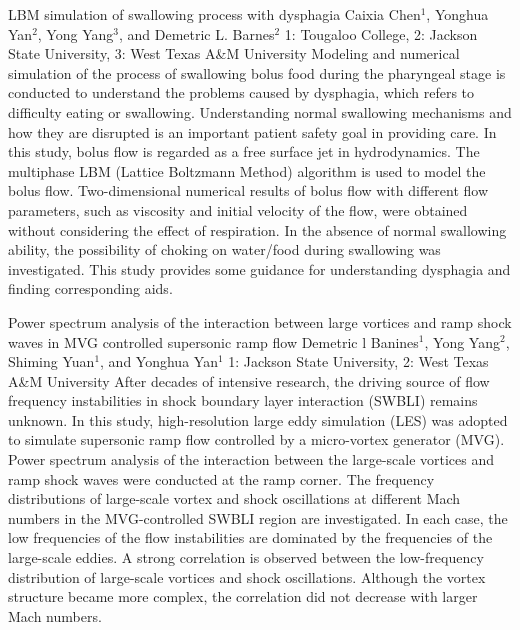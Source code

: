 \vspace{1.5ex}
\abs
{LBM simulation of swallowing process with dysphagia}
{Caixia Chen$^{1}$, Yonghua Yan$^{2}$, Yong Yang$^{3}$, and Demetric L. Barnes$^{2}$}
{1: Tougaloo College, 2: Jackson State University, 3: West Texas A\&M University}
{Modeling and numerical simulation of the process of swallowing bolus food during the pharyngeal stage is conducted to understand the problems caused by dysphagia, which refers to difficulty eating or swallowing. Understanding normal swallowing mechanisms and how they are disrupted is an important patient safety goal in providing care. In this study, bolus flow is regarded as a free surface jet in hydrodynamics. The multiphase LBM (Lattice Boltzmann Method) algorithm is used to model the bolus flow. Two-dimensional numerical results of bolus flow with different flow parameters, such as viscosity and initial velocity of the flow, were obtained without considering the effect of respiration. In the absence of normal swallowing ability, the possibility of choking on water/food during swallowing was investigated. This study provides some guidance for understanding dysphagia and finding corresponding aids.}


\vspace{1.5ex}
\abs
{Power spectrum analysis of the interaction between large vortices and ramp shock waves in MVG controlled supersonic ramp flow}
{Demetric l Banines$^{1}$, Yong Yang$^{2}$, Shiming Yuan$^{1}$, and Yonghua Yan$^{1}$}
{1: Jackson State University, 2: West Texas A\&M University}
{After decades of intensive research, the driving source of flow frequency instabilities in shock boundary layer interaction (SWBLI) remains unknown. In this study, high-resolution large eddy simulation (LES) was adopted to simulate supersonic ramp flow controlled by a micro-vortex generator (MVG). Power spectrum analysis of the interaction between the large-scale vortices and ramp shock waves were conducted at the ramp corner. The frequency distributions of large-scale vortex and shock oscillations at different Mach numbers in the MVG-controlled SWBLI region are investigated. In each case, the low frequencies of the flow instabilities are dominated by the frequencies of the large-scale eddies. A strong correlation is observed between the low-frequency distribution of large-scale vortices and shock oscillations. Although the vortex structure became more complex, the correlation did not decrease with larger Mach numbers.}


